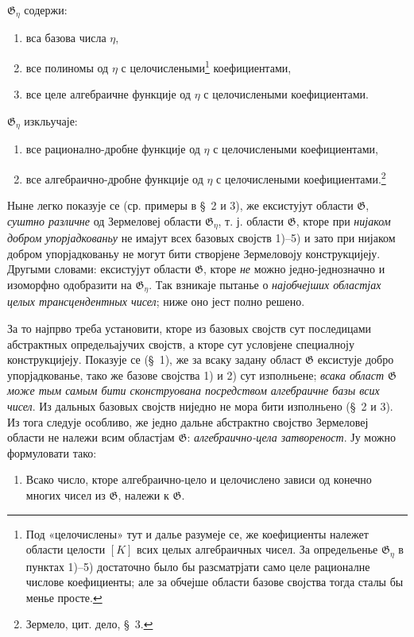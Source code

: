 ﻿\documentclass[11pt]{article}
\begin{document}
$\mathfrak G_\eta$ содержи:
\begin{enumerate}
\item[1)] вса базова числа $\eta$,
\item[2)] все полиномы од $\eta$ с целочислеными\footnote{Под «целочислены» тут и далье разумеје се, же коефициенты належет области целости $[K]$ всих целых алгебраичных чисел. За определьенье $\mathfrak G_\eta$ в пунктах 1)--5) достаточно было бы разсматрјати само целе рационалне числове коефициенты; але за обчејше области базове својства тогда сталы бы менье просте.} коефициентами,
\item[3)] все целе алгебраичне функције од $\eta$ с целочислеными коефициентами.
\end{enumerate}
$\mathfrak G_\eta$ изкльучаје:
\begin{enumerate}
\item[4)] все рационално-дробне функције од $\eta$ с целочислеными коефициентами,
\item[5)] все алгебраично-дробне функције од $\eta$ с целочислеными коефициентами.\footnote{Зермело, цит. дело, \S\ 3.}
\end{enumerate}

Ныне легко показује се (ср. примеры в \S\ 2 и 3), же ексистујут области $\mathfrak G$, {\itshape суштно различне} од Зермеловеј области $\mathfrak G_\eta$, т. ј. области $\mathfrak G$, кторе при {\itshape нијаком добром упорјадкованьу} не имајут всех базовых својств 1)--5) и зато при нијаком добром упорјадкованьу не могут бити створјене Зермеловоју конструкцијеју. Другыми словами: ексистујут области $\mathfrak G$, кторе {\itshape не} можно једно-једнозначно и изоморфно одобразити на $\mathfrak G_\eta$. Так взникаје пытанье о {\itshape најобчејших областјах целых трансцендентных чисел}; ниже оно јест полно решено.

За то најпрво треба установити, кторе из базовых својств сут последицами абстрактных определьајучих својств, а кторе сут условјене специалноју конструкцијеју. Показује се (\S\ 1), же за всаку задану област $\mathfrak G$ ексистује добро упорјадкованье, тако же базове својства 1) и 2) сут изполньене; {\itshape всака област $\mathfrak G$ може тым самым бити сконструована посредством алгебраичне базы всих чисел}. Из дальных базовых својств ниједно не мора бити изполньено (\S\ 2 и 3). Из тога следује особливо, же једно дальне абстрактно својство Зермеловеј области не належи всим областјам $\mathfrak G$: {\itshape алгебраично-цела затвореност}. Ју можно формуловати тако:
\begin{enumerate}
\item[В.] Всако число, кторе алгебраично-цело и целочислено зависи од конечно многих чисел из $\mathfrak G$, належи к $\mathfrak G$.
\end{enumerate}
\end{document}
